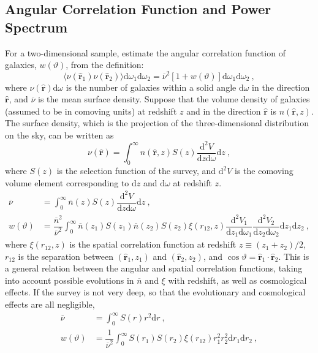 \documentclass[12pt,a4paper]{article}
\renewcommand{\vec}[1]{\boldsymbol{#1}}
\newcommand{\dif}{\mathrm{d}}
\begin{document}
\subsection{Angular Correlation Function and Power Spectrum}
\cite{2010gfe..book.....M} For a two-dimensional sample, estimate the angular correlation function of galaxies, $w(\vartheta)$, from the definition:
\begin{equation}
\langle \nu(\hat{\vec{r}}_1) \nu(\hat{\vec{r}}_2) \rangle \dif \omega_1 \dif \omega_2 = \overline{\nu}^2 [1+w(\vartheta)]  \dif \omega_1 \dif \omega_2 ~,
\end{equation}
where $\nu(\hat{\vec{r}}) \dif \omega$ is the number of galaxies within a solid angle $ \dif \omega$ in the direction $\hat{\vec{r}}$, and $\overline{\nu}$ is the mean surface density. Suppose that the volume density of galaxies (assumed to be in comoving units) at redshift $z$ and in the direction $\hat{\vec{r}}$ is $n(\hat{\vec{r}},z)$. The surface density, which is the projection of the three-dimensional distribution on the sky, can be written as
\begin{equation}
\nu(\hat{\vec{r}})  = \int_0^\infty n(\hat{\vec{r}},z) S(z) \dfrac{\dif^2 V}{\dif z \dif \omega} \dif z ~,
\end{equation}
where $S(z)$ is the selection function of the survey, and $\dif^2 V$ is the comoving volume element corresponding to $\dif z$ and $\dif \omega$ at redshift $z$.
\begin{align}
\overline{\nu} &= \int_0^\infty \overline{n}(z) S(z) \dfrac{\dif^2 V}{\dif z \dif \omega} \dif z ~, \\
w(\vartheta) &= \dfrac{\overline{n}^2}{\overline{\nu}^2} \int_0^\infty \overline{n}(z_1) S(z_1) \overline{n}(z_2)S(z_2) \xi(r_{12}, z) \dfrac{\dif^2 V_1}{\dif z_1 \dif \omega_1}  \dfrac{\dif^2 V_2}{\dif z_2 \dif \omega_2} \dif z_1 \dif z_2 ~,
\end{align}
where $\xi(r_{12}, z)$ is the spatial correlation function at redshift $z \equiv (z_1 + z_2 )/2$, $r_{12}$ is the separation between $(\hat{\vec{r}}_1,z_1)$ and $(\hat{\vec{r}}_2,z_2)$, and $\cos \vartheta = \hat{\vec{r}}_1 \cdot \hat{\vec{r}}_2$. This is a general relation between the angular and spatial correlation functions, taking into account possible evolutions in $\overline{n}$ and $\xi$ with redshift, as well as cosmological effects. If the survey is not very deep, so that the evolutionary and cosmological effects are all negligible, 
\begin{align}
\overline{\nu} &= \int_0^\infty S(r) r^2 \dif r ~, \\
w(\vartheta) &= \dfrac{1}{\overline{\nu}^2} \int_0^\infty S(r_1) S(r_2) \xi(r_{12}) r_1^2 r_2^2  \dif r_1 \dif r_2 ~, 
\end{align}
\end{document}
